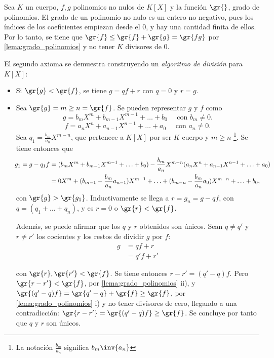 \begin{dem}{\cite[p.~53]{Rosenberger}}
    Sea $K$ un cuerpo, $f,g$ polinomios no nulos de $K[X]$ y la función $\gr{}$, grado de polinomios. El grado de un polinomio no nulo es un entero no negativo, pues los índices de los coeficientes empiezan desde el 0, y hay una cantidad finita de ellos. Por lo tanto, se tiene que $\gr{f} \leq \gr{f} + \gr{g} = \gr{fg}$ por \ref{lema:grado_polinomios} y no tener $K$ divisores de 0.
    \item El segundo axioma se demuestra construyendo un \textit{algoritmo de división} para \textit{$K[X]$}:
    \begin{itemize}
        \item Si $\gr{g} < \gr{f}$, se tiene $g = qf + r$ con $q = 0$ y $r = g$.
        \item Sea $\gr{g}  = m\geq n =\gr{f}$. Se pueden representar $g$ y $f$ como
        \vspace{-0.2em}
            \[ g = b_mX^m + b_{m-1}X^{m-1} +\ldots + b_0 \quad \text{ con } b_m \neq 0.\]
            \[ f = a_nX^n + a_{n-1}X^{n-1} +\ldots + a_0 \quad \text{ con } a_n \neq 0.\]
            Sea $q_1 = \frac{b_m}{a_n}X^{m-n}$, que pertenece a $K[X]$ por ser $K$ cuerpo y $m\geq n$ \footnote{La notación $\frac{b_m}{a_n}$ significa $b_m\inv{a_n}$}. Se tiene entonces que 
            \vspace{-1em}
            \begin{align*}
             \hspace{-2.6pt}g_1 = g - q_1f &= (b_mX^m + b_{m-1}X^{m-1} +\ldots + b_0) -\frac{b_m}{a_n}X^{m-n}(a_nX^n + a_{n-1}X^{n-1} +\ldots + a_0)\\
             &= 0X^m + (b_{m-1}-\frac{b_m}{a_n}a_{n-1})X^{m-1} + \ldots + (b_{m-n}-\frac{b_{m}}{a_n}a_{0})X^{m-n} + \ldots + b_0,
        \end{align*}
        con $\gr{g} > \gr{g_1}$. Inductivamente se llega a $r = g_n = g - qf$, con $q = (q_1 + \ldots + q_n)$, y es $r = 0$ o $\gr{r} < \gr{f}$.

        Además, se puede afirmar que los $q$ y $r$ obtenidos son únicos. Sean $q \neq q'$ y $r\neq r'$ los cocientes y los restos de dividir $g$ por $f$:
        \vspace{-1em}
            \begin{align*}
             g &= qf + r\\
                &= q'f + r'
            \end{align*}
        
        con $\gr{r}, \gr {r'} < \gr {f}$. Se tiene entonces $r - r' = (q'-q)f$. Pero $\gr{r-r'} < \gr{f}$, por \ref{lema:grado_polinomios} ii), y $\gr{(q'-q)f} = \gr{q'-q} + \gr{f} \geq \gr{f}$, por \ref{lema:grado_polinomios} i) y no tener divisores de cero, llegando a una contradicción: $\gr{r-r'}  = \gr{(q'-q)f} \geq \gr{f}$. Se concluye por tanto que $q$ y $r$ son únicos.
    \end{itemize}
\end{dem}


